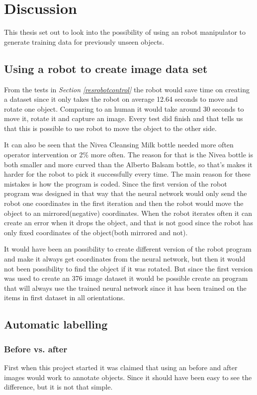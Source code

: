 \chapter{Discussion}
This thesis set out to look into the possibility of using an robot manipulator to generate training data for previously unseen objects.
\section{Using a robot to create image data set}
From the tests in \textit{Section \ref{resrobotcontrol}} the robot would save time on creating a dataset since it only takes the robot on average 12.64 seconds to move and rotate one object. Comparing to an human it would take around 30 seconds to move it, rotate it and capture an image. Every test did finish and that tells us that this is possible to use robot to move the object to the other side. 

It can also be seen that the Nivea Cleansing Milk bottle needed more often operator intervention or 2\% more often. The reason for that is the Nivea bottle is both smaller and more curved than the Alberto Balsam bottle, so that's makes it harder for the robot to pick it successfully every time. The main reason for these mistakes is how the program is coded. Since the first version of the robot program was designed in that way that the neural network would only send the robot one coordinates in the first iteration and then the robot would move the object to an mirrored(negative) coordinates. When the robot iterates often it can create an error when it drops the object, and that is not good since the robot has only fixed coordinates of the object(both mirrored and not).

It would have been an possibility to create different version of the robot program and make it always get coordinates from the neural network, but then it would not been possibility to find the object if it was rotated. But since the first version was used to create an 376 image dataset it would be possible create an program that will always use the trained neural network since it has been trained on the items in first dataset in all orientations.


\section{Automatic labelling}
\subsection{Before vs. after}
First when this project started it was claimed that using an before and after images would work to annotate objects. Since it should have been easy to see the difference, but it is not that simple.

